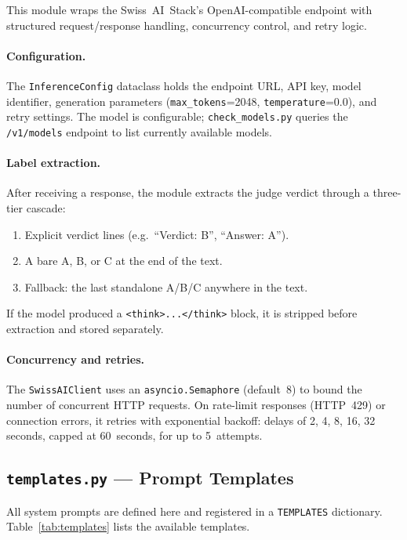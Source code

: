 \documentclass[11pt,a4paper]{article}
\begin{document}
This module wraps the Swiss~AI~Stack's OpenAI-compatible endpoint with
structured request/response handling, concurrency control, and retry logic.

\paragraph{Configuration.}
The \texttt{InferenceConfig} dataclass holds the endpoint URL, API key, model
identifier, generation parameters (\texttt{max\_tokens}=2048,
\texttt{temperature}=0.0), and retry settings. The model is configurable;
\texttt{check\_models.py} queries the \texttt{/v1/models} endpoint to list
currently available models.

\paragraph{Label extraction.}
After receiving a response, the module extracts the judge verdict through a
three-tier cascade:
\begin{enumerate}[nosep]
  \item Explicit verdict lines (e.g.\ ``Verdict: B'', ``Answer: A'').
  \item A bare A, B, or C at the end of the text.
  \item Fallback: the last standalone A/B/C anywhere in the text.
\end{enumerate}
If the model produced a \texttt{<think>...</think>} block, it is stripped
before extraction and stored separately.

\paragraph{Concurrency and retries.}
The \texttt{SwissAIClient} uses an \texttt{asyncio.Semaphore} (default~8) to
bound the number of concurrent HTTP requests. On rate-limit responses (HTTP~429)
or connection errors, it retries with exponential backoff: delays of 2, 4, 8,
16, 32 seconds, capped at 60~seconds, for up to 5~attempts.


\subsection{\texttt{templates.py} --- Prompt Templates}

All system prompts are defined here and registered in a \texttt{TEMPLATES}
dictionary. Table~\ref{tab:templates} lists the available templates.
\end{document}
